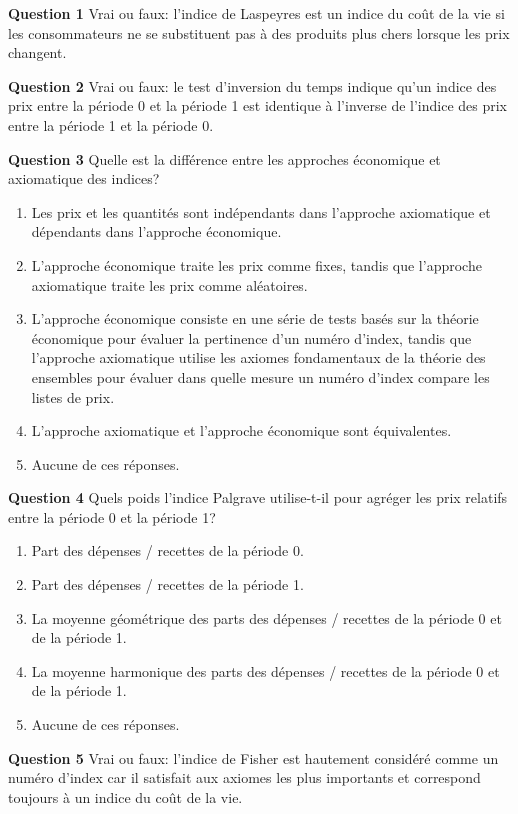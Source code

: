 \documentclass[
]{article}
\begin{document}
\textbf{Question 1} Vrai ou faux: l'indice de Laspeyres est un indice du coût de la vie si les consommateurs ne se substituent pas à des produits plus chers lorsque les prix changent.

\textbf{Question 2} Vrai ou faux: le test d'inversion du temps indique qu'un indice des prix entre la période 0 et la période 1 est identique à l'inverse de l'indice des prix entre la période 1 et la période 0.

\textbf{Question 3} Quelle est la différence entre les approches économique et axiomatique des indices?

\begin{enumerate}
\def\labelenumi{\alph{enumi})}
\item
  Les prix et les quantités sont indépendants dans l'approche axiomatique et dépendants dans l'approche économique.
\item
  L'approche économique traite les prix comme fixes, tandis que l'approche axiomatique traite les prix comme aléatoires.
\item
  L'approche économique consiste en une série de tests basés sur la théorie économique pour évaluer la pertinence d'un numéro d'index, tandis que l'approche axiomatique utilise les axiomes fondamentaux de la théorie des ensembles pour évaluer dans quelle mesure un numéro d'index compare les listes de prix.
\item
  L'approche axiomatique et l'approche économique sont équivalentes.
\item
  Aucune de ces réponses.
\end{enumerate}

\textbf{Question 4} Quels poids l'indice Palgrave utilise-t-il pour agréger les prix relatifs entre la période 0 et la période 1?

\begin{enumerate}
\def\labelenumi{\alph{enumi})}
\item
  Part des dépenses / recettes de la période 0.
\item
  Part des dépenses / recettes de la période 1.
\item
  La moyenne géométrique des parts des dépenses / recettes de la période 0 et de la période 1.
\item
  La moyenne harmonique des parts des dépenses / recettes de la période 0 et de la période 1.
\item
  Aucune de ces réponses.
\end{enumerate}

\textbf{Question 5} Vrai ou faux: l'indice de Fisher est hautement considéré comme un numéro d'index car il satisfait aux axiomes les plus importants et correspond toujours à un indice du coût de la vie.
\end{document}
